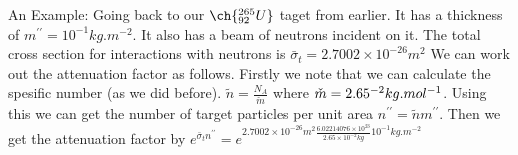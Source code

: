 \begin{framed}
An Example: Going back to our $\ch{^{265}_{92}U}$ taget from earlier. It has a thickness of $m^{\prime\prime}=10^{-1}kg.m^{-2}$. It also has a beam of neutrons incident on it. The total cross section for interactions with neutrons is $\bar{\sigma}_t=2.7002\times10^{-26}m^2$ We can work out the attenuation factor as follows. Firstly we note that we can calculate the spesific number (as we did before). $\tilde{n}=\frac{N_A}{\check{m}}$ where $\check{m}=2.65\time10^{-2}kg.mol^{-1}$. Using this we can get the number of target particles per unit area $n^{\prime\prime}=\tilde{n}m^{\prime\prime}$.
Then we get the attenuation factor by $e^{\bar{\sigma}_t n^{\prime\prime}}=e^{2.7002\times10^{-26}m^2 \frac{6.02214076\times10^{23}}{2.65\times10^{-2}kg}10^{-1}kg.m^{-2}}$
\end{framed}
